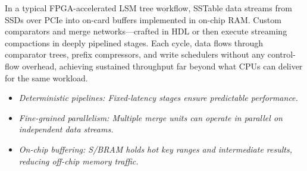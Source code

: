 \documentclass[sigconf]{acmart}
\begin{document}
  In a typical FPGA-accelerated LSM tree workflow, SSTable data streams from SSDs over PCIe into on-card buffers implemented in on-chip RAM.
  Custom comparators and merge networks—crafted in HDL or then execute streaming compactions in deeply pipelined stages.
  Each cycle, data flows through comparator trees, prefix compressors, and write schedulers without any control-flow overhead, achieving sustained throughput far beyond what CPUs can deliver for the same workload. \cite{zhang2020fpga}

  \begin{itemize}
    \item \em Deterministic pipelines: Fixed-latency stages ensure predictable performance.
    \item \em Fine-grained \em parallelism: Multiple merge units can operate in parallel on independent data streams.
    \item \em On-chip buffering: S/BRAM holds hot key ranges and intermediate results, reducing off-chip memory traffic.
  \end{itemize}
\end{document}
